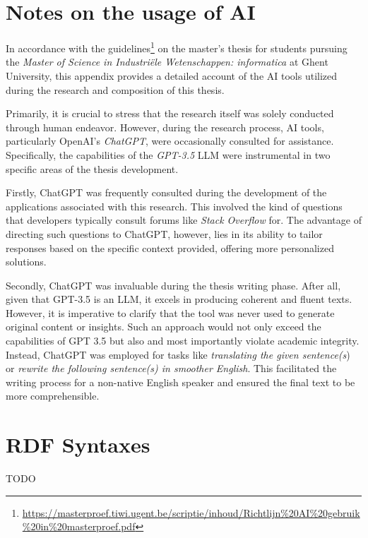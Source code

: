 \appendix
\renewcommand{\thesection}{\Alph{section}}
\setcounter{section}{0}

\begin{appendices}

\section{Notes on the usage of AI}
\label{app:ai}

In accordance with the guidelines\footnote{\url{https://masterproef.tiwi.ugent.be/scriptie/inhoud/Richtlijn\%20AI\%20gebruik\%20in\%20masterproef.pdf}} on the master's thesis for students pursuing the \textit{Master of Science in Industriële Wetenschappen: informatica} at Ghent University, this appendix provides a detailed account of the AI tools utilized during the research and composition of this thesis.

Primarily, it is crucial to stress that the research itself was solely conducted through human endeavor. However, during the research process, AI tools, particularly OpenAI's \textit{ChatGPT}, were occasionally consulted for assistance. Specifically, the capabilities of the \textit{GPT-3.5} LLM were instrumental in two specific areas of the thesis development.

Firstly, ChatGPT was frequently consulted during the development of the applications associated with this research. This involved the kind of questions that developers typically consult forums like \textit{Stack Overflow} for. The advantage of directing such questions to ChatGPT, however, lies in its ability to tailor responses based on the specific context provided, offering more personalized solutions.

Secondly, ChatGPT was invaluable during the thesis writing phase. After all, given that GPT-3.5 is an LLM, it excels in producing coherent and fluent texts. However, it is imperative to clarify that the tool was never used to generate original content or insights. Such an approach would not only exceed the capabilities of GPT 3.5 but also and most importantly violate academic integrity. Instead, ChatGPT was employed for tasks like \textit{translating the given sentence(s}) or \textit{rewrite the following sentence(s) in smoother English}. This facilitated the writing process for a non-native English speaker and ensured the final text to be more comprehensible.

\newpage
\section{RDF Syntaxes}

TODO

\end{appendices}
